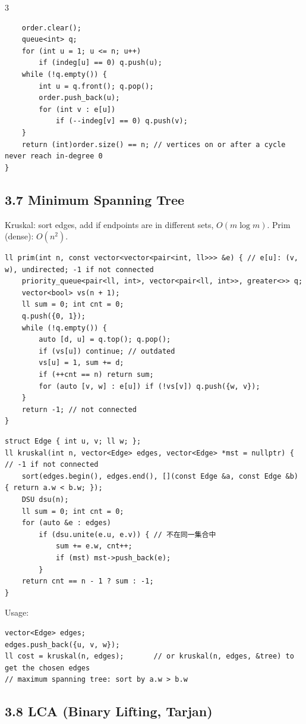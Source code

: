 \documentclass[8pt]{extarticle}
\begin{document}
\begin{multicols*}{3}
\begin{lstlisting}
    order.clear();
    queue<int> q;
    for (int u = 1; u <= n; u++)
        if (indeg[u] == 0) q.push(u);
    while (!q.empty()) {
        int u = q.front(); q.pop();
        order.push_back(u);
        for (int v : e[u])
            if (--indeg[v] == 0) q.push(v);
    }
    return (int)order.size() == n; // vertices on or after a cycle never reach in-degree 0
}
\end{lstlisting}

\subsection*{3.7 Minimum Spanning Tree}

Kruskal: sort edges, add if endpoints are in different sets, $O(m \log m)$. Prim (dense): $O(n^2)$.

\begin{lstlisting}
ll prim(int n, const vector<vector<pair<int, ll>>> &e) { // e[u]: (v, w), undirected; -1 if not connected
    priority_queue<pair<ll, int>, vector<pair<ll, int>>, greater<>> q;
    vector<bool> vs(n + 1);
    ll sum = 0; int cnt = 0;
    q.push({0, 1});
    while (!q.empty()) {
        auto [d, u] = q.top(); q.pop();
        if (vs[u]) continue; // outdated
        vs[u] = 1, sum += d;
        if (++cnt == n) return sum;
        for (auto [v, w] : e[u]) if (!vs[v]) q.push({w, v});
    }
    return -1; // not connected
}
\end{lstlisting}

\begin{lstlisting}
struct Edge { int u, v; ll w; };
ll kruskal(int n, vector<Edge> edges, vector<Edge> *mst = nullptr) { // -1 if not connected
    sort(edges.begin(), edges.end(), [](const Edge &a, const Edge &b) { return a.w < b.w; });
    DSU dsu(n);
    ll sum = 0; int cnt = 0;
    for (auto &e : edges)
        if (dsu.unite(e.u, e.v)) { // 不在同一集合中
            sum += e.w, cnt++;
            if (mst) mst->push_back(e);
        }
    return cnt == n - 1 ? sum : -1;
}
\end{lstlisting}

Usage:

\begin{lstlisting}
vector<Edge> edges;
edges.push_back({u, v, w});
ll cost = kruskal(n, edges);       // or kruskal(n, edges, &tree) to get the chosen edges
// maximum spanning tree: sort by a.w > b.w
\end{lstlisting}

\subsection*{3.8 LCA (Binary Lifting, Tarjan)}


\end{multicols*}
\end{document}
